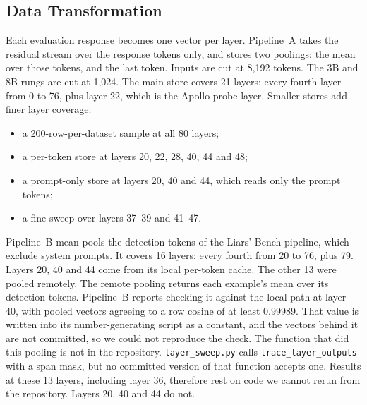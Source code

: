 \subsection{Data Transformation}
\label{sec:m-transform}

Each evaluation response becomes one vector per layer. Pipeline~A takes the residual stream over the response tokens only, and stores two poolings: the mean over those tokens, and the last token. %
Inputs are cut at 8{,}192 tokens. %
The 3B and 8B rungs are cut at 1{,}024. %
The main store covers 21 layers: every fourth layer from 0 to 76, plus layer 22, which is the Apollo probe layer. %
Smaller stores add finer layer coverage:
\begin{itemize}
\item a 200-row-per-dataset sample at all 80 layers;
\item a per-token store at layers 20, 22, 28, 40, 44 and 48;
\item a prompt-only store at layers 20, 40 and 44, which reads only the prompt tokens;
\item a fine sweep over layers 37--39 and 41--47.
\end{itemize}
Pipeline~B mean-pools the detection tokens of the Liars' Bench pipeline, which exclude system prompts. It covers 16 layers: every fourth from 20 to 76, plus 79. %
Layers 20, 40 and 44 come from its local per-token cache. The other 13 were pooled remotely. %
The remote pooling returns each example's mean over its detection tokens. Pipeline~B reports checking it against the local path at layer 40, with pooled vectors agreeing to a row cosine of at least 0.99989. That value is written into its number-generating script as a constant, and the vectors behind it are not committed, so we could not reproduce the check. %
The function that did this pooling is not in the repository. \texttt{layer\_sweep.py} calls \texttt{trace\_layer\_outputs} with a span mask, but no committed version of that function accepts one. Results at these 13 layers, including layer 36, therefore rest on code we cannot rerun from the repository. Layers 20, 40 and 44 do not. %

